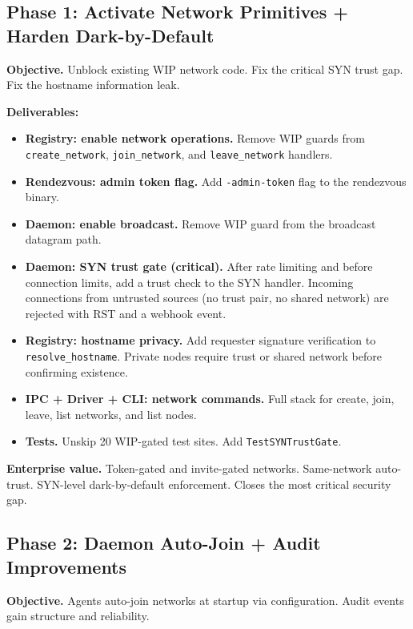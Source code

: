 \documentclass[11pt,a4paper]{article}
\begin{document}
\subsection{Phase 1: Activate Network Primitives + Harden Dark-by-Default}

\textbf{Objective.} Unblock existing WIP network code. Fix the critical SYN trust gap. Fix the hostname information leak.

\textbf{Deliverables:}
\begin{itemize}
    \item \textbf{Registry: enable network operations.} Remove WIP guards from \texttt{create\_network}, \texttt{join\_network}, and \texttt{leave\_network} handlers.
    \item \textbf{Rendezvous: admin token flag.} Add \texttt{-admin-token} flag to the rendezvous binary.
    \item \textbf{Daemon: enable broadcast.} Remove WIP guard from the broadcast datagram path.
    \item \textbf{Daemon: SYN trust gate (critical).} After rate limiting and before connection limits, add a trust check to the SYN handler. Incoming connections from untrusted sources (no trust pair, no shared network) are rejected with RST and a webhook event.
    \item \textbf{Registry: hostname privacy.} Add requester signature verification to \texttt{resolve\_hostname}. Private nodes require trust or shared network before confirming existence.
    \item \textbf{IPC + Driver + CLI: network commands.} Full stack for create, join, leave, list networks, and list nodes.
    \item \textbf{Tests.} Unskip 20 WIP-gated test sites. Add \texttt{TestSYNTrustGate}.
\end{itemize}

\textbf{Enterprise value.} Token-gated and invite-gated networks. Same-network auto-trust. SYN-level dark-by-default enforcement. Closes the most critical security gap.

\subsection{Phase 2: Daemon Auto-Join + Audit Improvements}

\textbf{Objective.} Agents auto-join networks at startup via configuration. Audit events gain structure and reliability.
\end{document}
